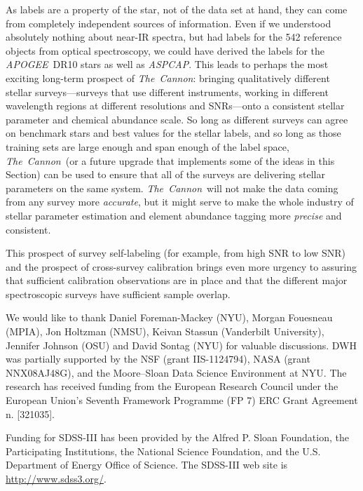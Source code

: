 \documentclass[12pt, preprint]{aastex}
\newcommand{\sectionname}{Section}
\newcommand{\tc}{\textsl{The~Cannon}}
\newcommand{\apogee}{\textsl{APOGEE}}
\newcommand{\aspcap}{\textsl{ASPCAP}}
\begin{document}
As labels are a property of the star, not of the data set at hand, they can come from completely independent sources of information. Even if we understood absolutely nothing about near-IR spectra, but had labels for the 542 reference objects from optical spectroscopy, we could have derived the labels for the \apogee\ DR10 stars as well as \aspcap. This leads to perhaps the most exciting long-term prospect of \tc : bringing
qualitatively different stellar surveys---surveys that use different
instruments, working in different wavelength regions at different
resolutions and SNRs---onto a consistent stellar parameter and
chemical abundance scale.
So long as different surveys can agree on benchmark stars and best
values for the stellar labels, and so long as those training sets are
large enough and span enough of the label space, \tc\ (or a future
upgrade that implements some of the ideas in this \sectionname) can be
used to ensure that all of the surveys are delivering stellar
parameters on the same system.
\tc\ will not make the data coming from any survey more
\emph{accurate}, but it might serve to make the whole industry of
stellar parameter estimation and element abundance tagging more \emph{precise} and consistent.

This prospect of survey self-labeling (for example, from high SNR to low SNR) and the prospect of cross-survey calibration brings even more urgency to assuring that sufficient calibration observations are in place and that the different major spectroscopic surveys have sufficient sample overlap.




\acknowledgements

We would like to thank Daniel Foreman-Mackey (NYU), 
Morgan Fouesneau (MPIA), Jon Holtzman (NMSU),  Keivan Stassun (Vanderbilt University), Jennifer Johnson (OSU) and David Sontag (NYU)
for valuable discussions.
DWH was partially supported by
the NSF (grant IIS-1124794), NASA (grant NNX08AJ48G), and the
Moore--Sloan Data Science Environment at NYU.
The research has received funding from the European Research Council under the European
Union's Seventh Framework Programme (FP 7) ERC Grant Agreement n.
[321035].

Funding for SDSS-III has been provided by the Alfred P. Sloan Foundation, the Participating Institutions, 
the National Science Foundation, and the U.S. Department of Energy Office of Science. The SDSS-III web site is \url{http://www.sdss3.org/}.
\end{document}
